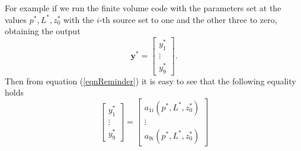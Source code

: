 \documentclass[12pt]{book}
\newcommand{\y}{\textbf{y}}
\begin{document}
For example if we run the finite volume code with the parameters set at the values
$p^{*},L^{*},z_{0}^{*}$ with the $i$-th source set to one and the other 
three to zero, obtaining the output
\begin{equation*}
\y^{*}=\begin{bmatrix}
y_{1}^{*}\\
\vdots\\
y_{9}^{*}
\end{bmatrix}.
\end{equation*}
Then from equation (\ref{eqnReminder}) it is easy to see that 
the following equality holds
\begin{equation*}
\begin{bmatrix}
y_{1}^{*}\\
\vdots\\
y_{9}^{*}
\end{bmatrix}=\begin{bmatrix}
a_{1i}(p^{*},L^{*},z_{0}^{*})\\
\vdots\\
a_{9i}(p^{*},L^{*},z_{0}^{*})
\end{bmatrix}
\end{equation*}
\end{document}
